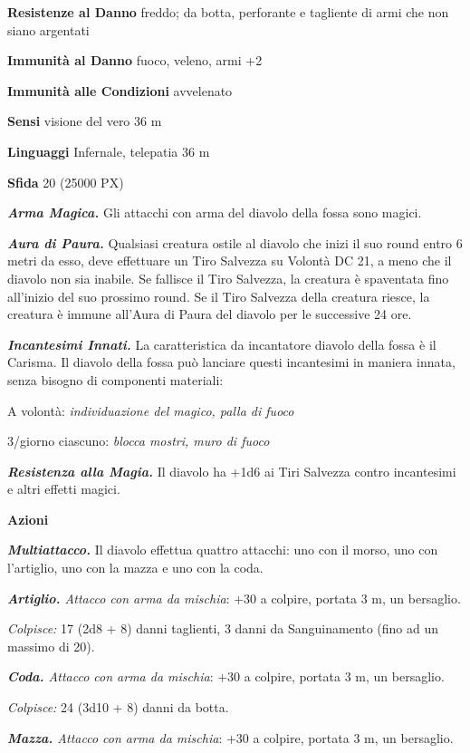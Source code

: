 \begin{multicols}{2}
	\textbf{Resistenze al Danno} freddo; da botta, perforante e tagliente di armi che non siano argentati

	\textbf{Immunità al Danno} fuoco, veleno, armi +2

	\textbf{Immunità alle Condizioni} avvelenato

	\textbf{Sensi} visione del vero 36 m

	\textbf{Linguaggi} Infernale, telepatia 36 m

	\textbf{Sfida} 20 (25000 PX)

	\textit{\textbf{Arma Magica.}} Gli attacchi con arma del diavolo della fossa sono magici.

	\textit{\textbf{Aura di Paura.}} Qualsiasi creatura ostile al diavolo che inizi il suo round entro 6 metri da esso, deve effettuare un Tiro Salvezza su Volontà DC 21, a meno che il diavolo non sia inabile. Se fallisce il Tiro Salvezza, la creatura è spaventata fino all'inizio del suo prossimo round. Se il Tiro Salvezza della creatura riesce, la creatura è immune all'Aura di Paura del diavolo per le successive 24 ore.

	\textit{\textbf{Incantesimi Innati.}} La caratteristica da incantatore diavolo della fossa è il Carisma. Il diavolo della fossa può lanciare questi incantesimi in maniera innata, senza bisogno di componenti materiali:

	A volontà: \textit{individuazione del magico, palla di fuoco}

	3/giorno ciascuno: \textit{blocca mostri, muro di fuoco}

	\textit{\textbf{Resistenza alla Magia.}} Il diavolo ha +1d6 ai Tiri Salvezza contro incantesimi e altri effetti magici.

	\textbf{Azioni}

	\textit{\textbf{Multiattacco.}} Il diavolo effettua quattro attacchi: uno con il morso, uno con l'artiglio, uno con la mazza e uno con la coda.

	\textit{\textbf{Artiglio.} Attacco con arma da mischia}: +30 a colpire, portata 3 m, un bersaglio.

	\textit{Colpisce:} 17 (2d8 + 8) danni taglienti, 3 danni da Sanguinamento (fino ad un massimo di 20).

	\textit{\textbf{Coda.} Attacco con arma da mischia}: +30 a colpire, portata 3 m, un bersaglio.

	\textit{Colpisce:} 24 (3d10 + 8) danni da botta.

	\textit{\textbf{Mazza.} Attacco con arma da mischia}: +30 a colpire, portata 3 m, un bersaglio.


\end{multicols}
